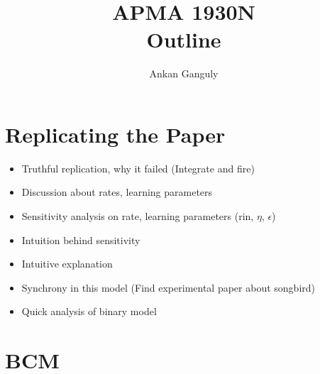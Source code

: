 \documentclass[12pt]{article}
\begin{document}
\newtheorem{lem}{Lemma}
\newtheorem{prop}{Proposition}
\newtheorem{defn}{Definition}
\newtheorem{exa}{Example}
\newtheorem{thm}{Theorem}


\newcommand{\solution}{
\skipLine

\textit{Solution: }}
\newcommand{\skipLine}{\vspace{12pt}}
\newcommand{\mc}{\mathcal}
\newcommand{\mb}{\mathbb}
\newcommand{\defeq}{:=}
\newcommand{\sm}{\setminus}
\newcommand{\limarg}[1]{\lim_{#1 \rightarrow\infty}}
\newcommand{\ms}{\mathscr}
\newcommand{\vspan}{\text{span}}
\newcommand{\ra}{\rightarrow}
\newcommand{\nra}{\nrightarrow}
\newcommand{\os}{\overset}
\newcommand{\ov}{\overline}
\newcommand{\supp}{\text{supp}}


\title{APMA 1930N \\ Outline}
\author{Ankan Ganguly}
\maketitle

\section{Replicating the Paper}

\begin{itemize}
\item Truthful replication, why it failed (Integrate and fire) 
\item Discussion about rates, learning parameters
\item Sensitivity analysis on rate, learning parameters (rin, \(\eta\), \(\epsilon\))
\item Intuition behind sensitivity
\item Intuitive explanation
\item Synchrony in this model (Find experimental paper about songbird)
\item Quick analysis of binary model
\end{itemize}

\section{BCM}
\end{document}
